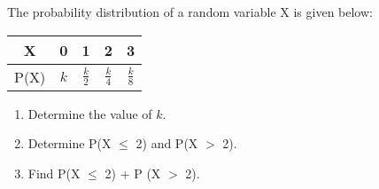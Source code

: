 \documentclass[journal,12pt,twocolumn]{IEEEtran}
\theoremstyle{remark}
\begin{document}
%
The probability distribution of a random variable X is given below:
\begin{table}[h]
    \centering
    \begin{tabular}{|c|c|c|c|c|}
        \hline
        X & 0 & 1 & 2 & 3 \\
        \hline
        P(X) & $k$ & $\frac{k}{2}$ & $\frac{k}{4}$ & $\frac{k}{8}$ \\
        \hline
    \end{tabular}
\end{table}
\begin{enumerate}
    \item Determine the value of $k$.
    \item Determine P(X $\le$ 2) and P(X $>$ 2).
    \item Find P(X $\le$ 2) + P (X $>$ 2).
\end{enumerate}
\solution 
\end{document}
